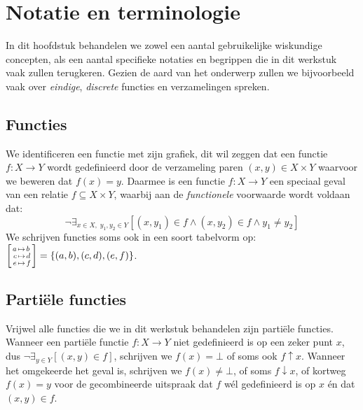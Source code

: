 
\chapter{Notatie en terminologie}
\label{chp:notatie}

In dit hoofdstuk behandelen we zowel een aantal gebruikelijke wiskundige concepten, als een aantal specifieke notaties en begrippen die in dit werkstuk vaak zullen terugkeren. Gezien de aard van het onderwerp zullen we bijvoorbeeld vaak over \emph{eindige}, \emph{discrete} functies en verzamelingen spreken.

\section{Functies}
\label{sec:afbeeldingen}

We identificeren een functie met zijn grafiek, dit wil zeggen dat een functie $f : X \to Y$ wordt gedefinieerd door de verzameling paren $(x, y) \in X \times Y$ waarvoor we beweren dat $f(x) = y$. Daarmee is een functie $f : X \to Y$ een speciaal geval van een relatie $f \subseteq X \times Y$, waarbij aan de \emph{functionele} voorwaarde wordt voldaan dat:
%
\begin{equation*}
  \neg \exists_{x \in X,\; y_1,y_2 \in Y} \left[ (x, y_1) \in f \land (x, y_2) \in f \land y_1 \neq y_2 \right]
\end{equation*}
%
We schrijven functies soms ook in een soort tabelvorm op: $\left[\Bindings{
  a & b \\
  c & d \\
  e & f
}\right] = \{(a, b), (c, d), (e, f)\}$.

\section{Partiële functies}
\label{sec:partielefuncties}

Vrijwel alle functies die we in dit werkstuk behandelen zijn partiële functies. Wanneer een partiële functie $f : X \to Y$ niet gedefinieerd is op een zeker punt $x$, dus $\neg \exists_{y \in Y} [ (x, y) \in f ]$, schrijven we $f(x) = \bot$ of soms ook $f \uparrow x$. Wanneer het omgekeerde het geval is, schrijven we $f(x) \neq \bot$, of soms $f \downarrow x$, of kortweg $f(x) = y$ voor de gecombineerde uitspraak dat $f$ wél gedefinieerd is op $x$ én dat $(x, y) \in f$.

